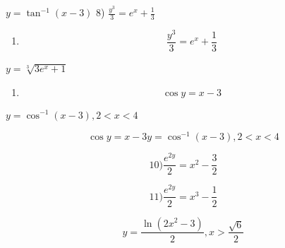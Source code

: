 \documentclass[
]{article}
\providecommand{\tightlist}{%
  \setlength{\itemsep}{0pt}\setlength{\parskip}{0pt}}
\begin{document}
\(y = \tan^{-1}(x - 3)\) 8) \(\frac{y^3}{3} = e^x + \frac{1}{3}\)

\begin{enumerate}
\def\labelenumi{\arabic{enumi})}
\setcounter{enumi}{7}
\tightlist
\item
  \[\frac{y^3}{3} = e^x + \frac{1}{3}\]
\end{enumerate}

\(y = \sqrt[3]{3e^x + 1}\)

\begin{enumerate}
\def\labelenumi{\arabic{enumi})}
\setcounter{enumi}{8}
\tightlist
\item
  \[\cos y = x - 3\]
\end{enumerate}

\(y = \cos^{-1}(x - 3), 2 < x < 4\)

\[\cos y = x - 3 y = \cos^{-1}(x - 3), 2 < x < 4\]

\[10) \frac{e^{2y}}{2} = x^2 - \frac{3}{2}\]

\[11) \frac{e^{2y}}{2} = x^3 - \frac{1}{2}\]

\[y = \frac{\ln(2x^2 - 3)}{2}, x > \frac{\sqrt{6}}{2}\]
\end{document}
